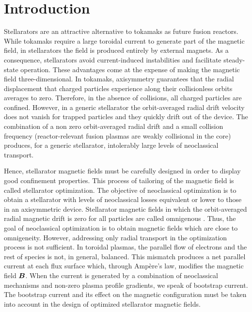 \documentclass[10pt]{iopart}
\begin{document}
\section{Introduction}
\label{sec:Introduction}
Stellarators are an attractive alternative to tokamaks as future fusion reactors. While tokamaks require a large toroidal current to generate part of the magnetic field, in stellarators the field is produced entirely by external magnets. As a consequence, stellarators avoid current-induced instabilities and facilitate steady-state operation. These advantages come at the expense of making the magnetic field three-dimensional. In tokamaks, axisymmetry guarantees that the radial displacement that charged particles experience along their collisionless orbits averages to zero. Therefore, in the absence of collisions, all charged particles are confined. However, in a generic stellarator the orbit-averaged radial drift velocity does not vanish for trapped particles and they quickly drift out of the device. The combination of a non zero orbit-averaged radial drift and a small collision frequency (reactor-relevant fusion plasmas are weakly collisional in the core) produces, for a generic stellarator, intolerably large levels of neoclassical transport. 

Hence, stellarator magnetic fields must be carefully designed in order to display good confinement properties. This process of tailoring of the magnetic field is called stellarator optimization. The objective of neoclassical optimization is to obtain a stellarator with levels of neoclassical losses equivalent or lower to those in an axisymmetric device. Stellarator magnetic fields in which the orbit-averaged radial magnetic drift is zero for all particles are called omnigenous \cite{Cary1997OmnigenityAQ}. Thus, the goal of neoclassical optimization is to obtain magnetic fields which are close to omnigeneity. However, addressing only radial transport in the optimization process is not sufficient. In toroidal plasmas, the parallel flow of electrons and the rest of species is not, in general, balanced. This mismatch produces a net parallel current at each flux surface which, through Ampère's law, modifies the magnetic field $\vb*{B}$. When the current is generated by a combination of neoclassical mechanisms and non-zero plasma profile gradients, we speak of bootstrap current. The bootstrap current and its effect on the magnetic configuration must be taken into account in the design of optimized stellarator magnetic fields. 
\end{document}
